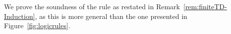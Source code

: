 \documentclass[a4paper,UKenglish,cleveref, autoref, thm-restate]{lipics-v2021}
\newcommand{\D}{\mathcal{D}}
\newcommand{\ts}{\vdash}
\newcommand{\hastype}[3]{#1\ts #2 : #3}
\newcommand{\Prop}{\mathsf{Prop}}
\newcommand{\TD}{\mathcal{D}}
\newcommand{\den}[1]{\llbracket #1\rrbracket}
\begin{document}
\begin{description}[font=\sc,wide]


   \item[Rule (ind$_{\TD}$):] 
    We prove the soundness of the rule as restated in Remark~\ref{rem:finiteTD-Induction}, as this is more general than the one presented in Figure~\ref{fig:logicrules}.
    

\end{description}
\end{document}
